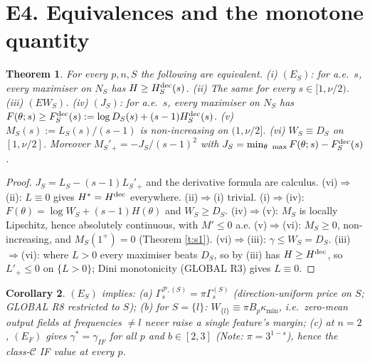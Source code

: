 \documentclass[11pt]{article}
\newtheorem{theorem}{Theorem}\newtheorem{lemma}[theorem]{Lemma}\newtheorem{proposition}[theorem]{Proposition}
\newtheorem{corollary}[theorem]{Corollary}
\theoremstyle{remark}\newtheorem{remark}[theorem]{Remark}
\begin{document}
\section{E4. Equivalences and the monotone quantity}
\begin{theorem}\label{t:eq}
For every $p,n,S$ the following are equivalent.
(i) $(E_S)$: for a.e.\ $s$, every maximiser on $N_S$ has $H\ge H^{\rm dec}_S(s)$. (ii) The same for every $s\in[1,\nu/2)$.
(iii) $(EW_S)$. (iv) $(J_S)$: for a.e.\ $s$, every maximiser on $N_S$ has $F(\theta;s)\ge F^{\rm dec}_S(s):=\log D_S(s)+(s-1)H^{\rm dec}_S(s)$.
(v) $M_S(s):=L_S(s)/(s-1)$ is non-increasing on $(1,\nu/2]$. (vi) $W_S\equiv D_S$ on $[1,\nu/2]$.
Moreover $M_S'{}_+=-J_S/(s-1)^2$ with $J_S=\min_{\theta\ \max}F(\theta;s)-F^{\rm dec}_S(s)$.
\end{theorem}
\begin{proof}
$J_S=L_S-(s-1)L_S'{}_+$ and the derivative formula are calculus. (vi)$\Rightarrow$(ii): $L\equiv0$ gives $H^*=H^{\rm dec}$ everywhere.
(ii)$\Rightarrow$(i) trivial. (i)$\Rightarrow$(iv): $F(\theta)=\log W_S+(s-1)H(\theta)$ and $W_S\ge D_S$. (iv)$\Rightarrow$(v): $M_S$ is locally Lipschitz,
hence absolutely continuous, with $M'\le0$ a.e. (v)$\Rightarrow$(vi): $M_S\ge0$, non-increasing, and $M_S(1^+)=0$ (Theorem \ref{t:s1}).
(vi)$\Rightarrow$(iii): $\gamma\le W_S=D_S$. (iii)$\Rightarrow$(vi): where $L>0$ every maximiser beats $D_S$, so by (iii) has $H\ge H^{\rm dec}$, so $L'_+\le0$ on $\{L>0\}$;
Dini monotonicity (GLOBAL R3) gives $L\equiv0$.
\end{proof}
\begin{corollary}\label{c:content}
$(E_S)$ implies: (a) $\Gamma^{\mathcal P,(S)}_s=\pi\Gamma^{(S)}_s$ (direction-uniform price on $S$; GLOBAL R8 restricted to $S$);
(b) for $S=\{l\}$: $W_{\{l\}}\equiv\pi B_p\kappa_{\min}$, i.e.\ zero-mean output fields at frequencies $\ne l$ never raise a single feature's margin;
(c) at $n=2$, $(E_F)$ gives $\gamma^*=\gamma_{IF}$ for all $p$ and $b\in[2,3]$ (Note: $\pi=3^{1-s}$), hence the class-$\mathcal C$ IF value at every $p$.
\end{corollary}
\end{document}
